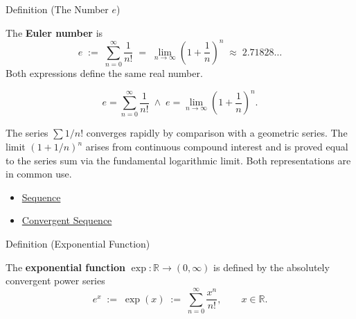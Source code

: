 \begin{definitionbox}{Definition (The Number $e$)}
\begin{definition}
\label{def:number-e}
The \textbf{Euler number} is
\[
  e \;:=\; \sum_{n=0}^{\infty} \frac{1}{n!}
  \;=\; \lim_{n \to \infty} \!\left(1 + \frac{1}{n}\right)^{\!n}
  \;\approx\; 2.71828\ldots
\]
Both expressions define the same real number.
\end{definition}
\end{definitionbox}

\begin{remark*}
\[
  e = \sum_{n=0}^\infty \frac{1}{n!}
  \;\wedge\;
  e = \lim_{n\to\infty}\!\left(1+\frac{1}{n}\right)^n.
\]
\end{remark*}

\begin{remark*}[Interpretation]
The series $\sum 1/n!$ converges rapidly by comparison with a
geometric series. The limit $(1+1/n)^n$ arises from continuous
compound interest and is proved equal to the series sum via the
fundamental logarithmic limit. Both representations are in common use.
\end{remark*}

\begin{dependencies}
\begin{itemize}
  \item \hyperref[def:sequence]{Sequence}
  \item \hyperref[def:convergent-sequence]{Convergent Sequence}
\end{itemize}
\end{dependencies}

\begin{definitionbox}{Definition (Exponential Function)}
\begin{definition}
\label{def:exponential}
The \textbf{exponential function} $\exp : \mathbb{R} \to (0,\infty)$
is defined by the absolutely convergent power series
\[
  e^x \;:=\; \exp(x) \;:=\; \sum_{n=0}^{\infty} \frac{x^n}{n!},
  \qquad x \in \mathbb{R}.
\]
\end{definition}
\end{definitionbox}

